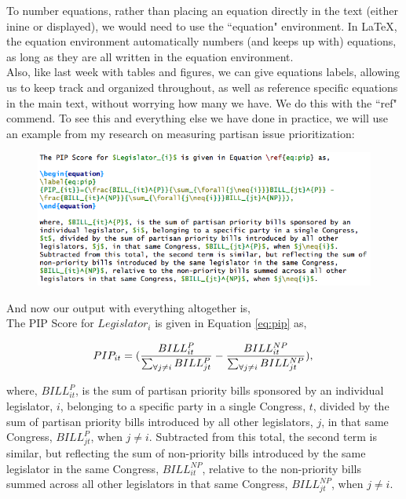 \documentclass[11pt]{article}
\newcommand{\forceindent}{\leavevmode{\parindent=1.5em\indent}} %
\begin{document}
\forceindent To number equations, rather than placing an equation directly in the text (either inine or displayed), we would need to use the ``equation" environment. In \LaTeX, the equation environment automatically numbers (and keeps up with) equations, as long as they are all written in the equation environment. \\

Also, like last week with tables and figures, we can give equations labels, allowing us to keep track and organized throughout, as well as reference specific equations in the main text, without worrying how many we have. We do this with the ``ref" commend. To see this and everything else we have done in practice, we will use an example from my research on measuring partisan issue prioritization: \\

\begin{figure}[!h]
	\includegraphics[scale=.5]{CODE6} \\
	\centering
\end{figure}

\newpage

And now our output with everything altogether is, \\

	The PIP Score for $Legislator_{i}$ is given in Equation \ref{eq:pip} as,

\begin{equation}
\label{eq:pip}
{PIP_{it}}=(\frac{BILL_{it}^{P}}{\sum_{\forall{j\neq{i}}}BILL_{jt}^{P}} - \frac{BILL_{it}^{NP}}{\sum_{\forall{j\neq{i}}}BILL_{jt}^{NP}}), \\
\end{equation}

where, $BILL_{it}^{P}$, is the sum of partisan priority bills sponsored by an individual legislator, $i$, belonging to a specific party in a single Congress, $t$, divided by the sum of partisan priority bills introduced by all other legislators, $j$, in that same Congress, $BILL_{jt}^{P}$, when $j\neq{i}$. Subtracted from this total, the second term is similar, but reflecting the sum of non-priority bills introduced by the same legislator in the same Congress, $BILL_{it}^{NP}$, relative to the non-priority bills summed across all other legislators in that same Congress, $BILL_{jt}^{NP}$, when $j\neq{i}$. \\
\end{document}
